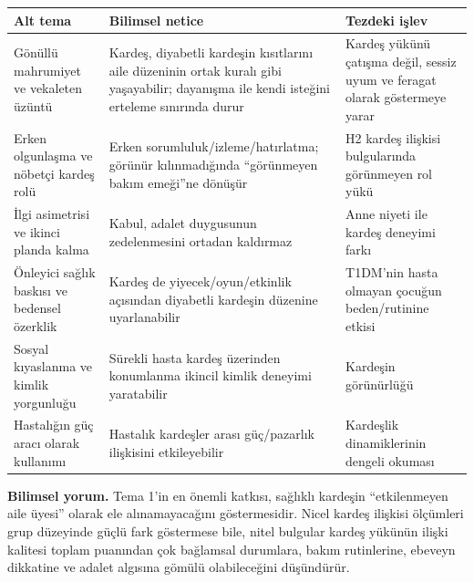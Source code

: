 \documentclass[
  turkish,
  a4paper,
  DIV=11,
  numbers=noendperiod]{scrreprt}
\newcounter{none} %
\begin{document}
{\def\LTcaptype{none} %
\begin{longtable}[]{@{}
  >{\raggedright\arraybackslash}p{}
  >{\raggedright\arraybackslash}p{}
  >{\raggedright\arraybackslash}p{}@{}}
\toprule\noalign{}
\begin{minipage}[b]{\linewidth}\raggedright
Alt tema
\end{minipage} & \begin{minipage}[b]{\linewidth}\raggedright
Bilimsel netice
\end{minipage} & \begin{minipage}[b]{\linewidth}\raggedright
Tezdeki işlev
\end{minipage} \\
\midrule\noalign{}
\endhead
\bottomrule\noalign{}
\endlastfoot
Gönüllü mahrumiyet ve vekaleten üzüntü & Kardeş, diyabetli kardeşin
kısıtlarını aile düzeninin ortak kuralı gibi yaşayabilir; dayanışma ile
kendi isteğini erteleme sınırında durur & Kardeş yükünü çatışma değil,
sessiz uyum ve feragat olarak göstermeye yarar \\
Erken olgunlaşma ve nöbetçi kardeş rolü & Erken
sorumluluk/izleme/hatırlatma; görünür kılınmadığında ``görünmeyen bakım
emeği''ne dönüşür & H2 kardeş ilişkisi bulgularında görünmeyen rol
yükü \\
İlgi asimetrisi ve ikinci planda kalma & Kabul, adalet duygusunun
zedelenmesini ortadan kaldırmaz & Anne niyeti ile kardeş deneyimi
farkı \\
Önleyici sağlık baskısı ve bedensel özerklik & Kardeş de
yiyecek/oyun/etkinlik açısından diyabetli kardeşin düzenine
uyarlanabilir & T1DM'nin hasta olmayan çocuğun beden/rutinine etkisi \\
Sosyal kıyaslanma ve kimlik yorgunluğu & Sürekli hasta kardeş üzerinden
konumlanma ikincil kimlik deneyimi yaratabilir & Kardeşin görünürlüğü \\
Hastalığın güç aracı olarak kullanımı & Hastalık kardeşler arası
güç/pazarlık ilişkisini etkileyebilir & Kardeşlik dinamiklerinin dengeli
okuması \\
\end{longtable}
}

\textbf{Bilimsel yorum.} Tema 1'in en önemli katkısı, sağlıklı kardeşin
``etkilenmeyen aile üyesi'' olarak ele alınamayacağını göstermesidir.
Nicel kardeş ilişkisi ölçümleri grup düzeyinde güçlü fark göstermese
bile, nitel bulgular kardeş yükünün ilişki kalitesi toplam puanından çok
bağlamsal durumlara, bakım rutinlerine, ebeveyn dikkatine ve adalet
algısına gömülü olabileceğini düşündürür.
\end{document}
